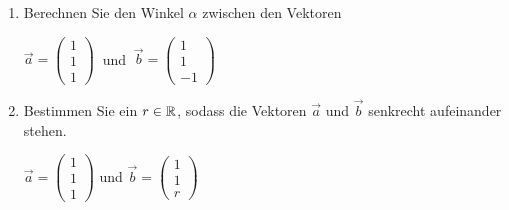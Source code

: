 \begin{ExerciseBlock}
\begin{enumerate}[label=\alph*)]

\item Berechnen Sie den Winkel $\alpha$ zwischen den Vektoren
\begin{center}
	$\vec{a}=\left(\begin{array}{c}  1 \\  1 \\  1  \end{array}\right) \ $ und 
	$\ \vec{b}=\left(\begin{array}{c}  1 \\  1 \\  -1  \end{array}\right)$
\end{center}

\item Bestimmen Sie ein $r \in \mathbb{R}$, sodass die Vektoren $\vec{a}$ und $\vec{b}$ senkrecht aufeinander stehen.
\begin{center}
$\vec{a}=\left(\begin{array}{c}  1 \\  1 \\  1  \end{array}\right)$ und $\vec{b}=\left(\begin{array}{c}  1 \\  1 \\  r  \end{array}\right)$
\end{center}

\end{enumerate}

\end{ExerciseBlock}

